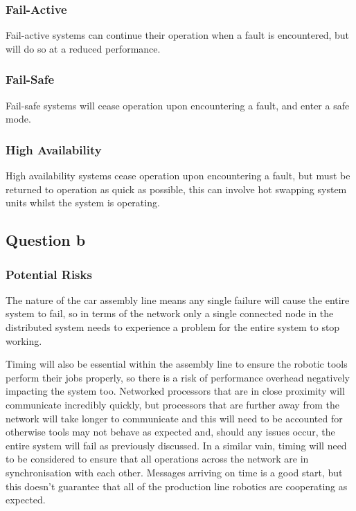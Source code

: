 \documentclass[]{report}
\begin{document}
				\subsubsection{Fail-Active}
				Fail-active systems can continue their operation when a fault is encountered, but will do so at a reduced performance.
				
				\subsubsection{Fail-Safe}
				Fail-safe systems will cease operation upon encountering a fault, and enter a safe mode.
				
				\subsubsection{High Availability}
				High availability systems cease operation upon encountering a fault, but must be returned to operation as quick as possible, this can involve hot swapping system units whilst the system is operating.
				
				
				
			
			\subsection{Question b}
				\subsubsection{Potential Risks}
				The nature of the car assembly line means any single failure will cause the entire system to fail, so in terms of the network only a single connected node in the distributed system needs to experience a problem for the entire system to stop working. 
				
				Timing will also be essential within the assembly line to ensure the robotic tools perform their jobs properly, so there is a risk of performance overhead negatively impacting the system too. Networked processors that are in close proximity will communicate incredibly quickly, but processors that are further away from the network will take longer to communicate and this will need to be accounted for otherwise tools may not behave as expected and, should any issues occur, the entire system will fail as previously discussed. In a similar vain, timing will need to be considered to ensure that all operations across the network are in synchronisation with each other. Messages arriving on time is a good start, but this doesn't guarantee that all of the production line robotics are cooperating as expected.
				
\end{document}
